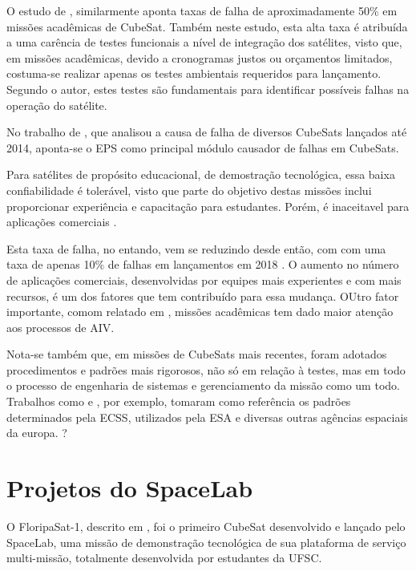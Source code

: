 O estudo de \textcite{first-100-cubesats}, similarmente aponta taxas de falha de aproximadamente 50\% em missões acadêmicas de CubeSat.
Também neste estudo, esta alta taxa é atribuída a uma carência de testes funcionais a nível de integração dos satélites, visto que, em missões acadêmicas, devido a cronogramas justos ou orçamentos limitados, costuma-se realizar apenas os testes ambientais requeridos para lançamento.
Segundo o autor, estes testes são fundamentais para identificar possíveis falhas na operação do satélite.

No trabalho de \textcite{reliability-of-cubesats}, que analisou a causa de falha de diversos CubeSats lançados até 2014, aponta-se o \gls{EPS} como principal módulo causador de falhas em CubeSats.

Para satélites de propósito educacional, de demostração tecnológica, essa baixa confiabilidade é tolerável, visto que parte do objetivo destas missões inclui proporcionar experiência e capacitação para estudantes.
Porém, é inaceitavel para aplicações comerciais \cite{overview-nanosat-test}.

Esta taxa de falha, no entando, vem se reduzindo desde então, com com uma taxa de apenas 10\% de falhas em lançamentos em 2018 \cite{aiv-istsat-1}.
O aumento no número de aplicações comerciais, desenvolvidas por equipes mais experientes e com mais recursos, é um dos fatores que tem contribuído para essa mudança.
OUtro fator importante, comom relatado em \textcite{aiv-istsat-1}, missões acadêmicas tem dado maior atenção aos processos de \gls{AIV}.

Nota-se também que, em missões de CubeSats mais recentes, foram adotados procedimentos e padrões mais rigorosos, não só em relação à testes, mas em todo o processo de engenharia de sistemas e gerenciamento da missão como um todo.
Trabalhos como \textcite{floripasat-1} e \textcite{tailoring-ecss-nanosat}, por exemplo, tomaram como referência os padrões determinados pela \gls{ECSS}, utilizados pela \gls{ESA} e diversas outras agências espaciais da europa.
?

\section{Projetos do SpaceLab}\label{sec:intro-spacelab}

O FloripaSat-1, descrito em \textcite{floripasat-1}, foi o primeiro CubeSat desenvolvido e lançado pelo SpaceLab, uma missão de demonstração tecnológica de sua plataforma de serviço multi-missão, totalmente desenvolvida por estudantes da \gls{UFSC}.

